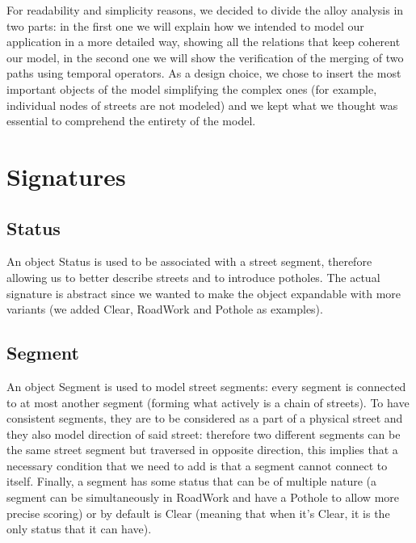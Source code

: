 For readability and simplicity reasons, we decided to divide the alloy analysis in two parts:  in the first one we will explain how we intended to model our application in a more detailed way, showing all the relations that keep coherent our model, in the second one we will show the verification of the merging of two paths using temporal operators. As a design choice, we chose to insert the most important objects of the model simplifying the complex ones (for example, individual nodes of streets are not modeled) and we kept what we thought was essential to comprehend the entirety of the model.

\section{Signatures}

\subsection{Status}

An object Status is used to be associated with a street segment, therefore allowing us to better describe streets and to introduce potholes. The actual signature is abstract since we wanted to make the object expandable with more variants (we added Clear, RoadWork and Pothole as examples).

\subsection{Segment}

An object Segment is used to model street segments: every segment is connected to at most another segment (forming what actively is a chain of streets). To have consistent segments, they are to be considered as a part of a physical street and they also model direction of said street: therefore two different segments can be the same street segment but traversed in opposite direction, this implies that a necessary condition that we need to add is that a segment cannot connect to itself. Finally, a segment has some status that can be of multiple nature (a segment can be simultaneously in RoadWork and have a Pothole to allow more precise scoring) or by default is Clear (meaning that when it's Clear, it is the only status that it can have).

